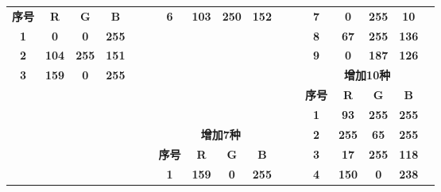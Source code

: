 \begin{table}[H]
\begin{tabular}{|ccccc|r|ccccr|r|ccccc|}
		\cmidrule{1-5}    \textbf{序号} & \textbf{R} & \textbf{G} & \textbf{B} &       &       & \textbf{6} & \textbf{103} & \textbf{250} & \textbf{152} & \cellcolor[rgb]{ .404,  .98,  .596} &       & \textbf{7} & \textbf{0} & \textbf{255} & \textbf{10} & \cellcolor[rgb]{ 0,  1,  .039} \\
		\cmidrule{7-11}    \textbf{1} & \textbf{0} & \textbf{0} & \textbf{255} & \cellcolor[rgb]{ 0,  0,  1} & \multicolumn{1}{r}{} &       &       &       &       & \multicolumn{1}{r}{} &       & \textbf{8} & \textbf{67} & \textbf{255} & \textbf{136} & \cellcolor[rgb]{ .263,  1,  .533} \\
		\textbf{2} & \textbf{104} & \textbf{255} & \textbf{151} & \cellcolor[rgb]{ .408,  1,  .592} & \multicolumn{1}{r}{} &       &       &       &       & \multicolumn{1}{r}{} &       & \textbf{9} & \textbf{0} & \textbf{187} & \textbf{126} & \cellcolor[rgb]{ 0,  .733,  .494} \\
		\cmidrule{13-17}    \textbf{3} & \textbf{159} & \textbf{0} & \textbf{255} & \cellcolor[rgb]{ .624,  0,  1} & \multicolumn{1}{r}{} &       &       &       &       & \multicolumn{1}{r}{} & \multicolumn{1}{r}{} & \multicolumn{5}{c}{\textbf{增加10种}} \\
		\cmidrule{1-5}\cmidrule{13-17}    \multicolumn{1}{r}{} &       &       &       & \multicolumn{1}{r}{} & \multicolumn{1}{r}{} &       &       &       &       & \multicolumn{1}{r}{} &       & \textbf{序号} & \textbf{R} & \textbf{G} & \textbf{B} &  \\
		\multicolumn{1}{r}{} &       &       &       & \multicolumn{1}{r}{} & \multicolumn{1}{r}{} &       &       &       &       & \multicolumn{1}{r}{} &       & \textbf{1} & \textbf{93} & \textbf{255} & \textbf{255} & \cellcolor[rgb]{ .365,  1,  1} \\
		\multicolumn{1}{r}{} &       &       &       & \multicolumn{1}{r}{} & \multicolumn{1}{r}{} & \multicolumn{5}{c}{\textbf{增加7种}}     &       & \textbf{2} & \textbf{255} & \textbf{65} & \textbf{255} & \cellcolor[rgb]{ 1,  .255,  1} \\
		\cmidrule{7-11}    \multicolumn{1}{r}{} &       &       &       & \multicolumn{1}{r}{} &       & \textbf{序号} & \textbf{R} & \textbf{G} & \textbf{B} &       &       & \textbf{3} & \textbf{17} & \textbf{255} & \textbf{118} & \cellcolor[rgb]{ .067,  1,  .463} \\
		\multicolumn{1}{r}{} &       &       &       & \multicolumn{1}{r}{} &       & \textbf{1} & \textbf{159} & \textbf{0} & \textbf{255} & \cellcolor[rgb]{ .624,  0,  1} &       & \textbf{4} & \textbf{150} & \textbf{0} & \textbf{238} & \cellcolor[rgb]{ .588,  0,  .933} \\

\end{tabular}
\end{table}
